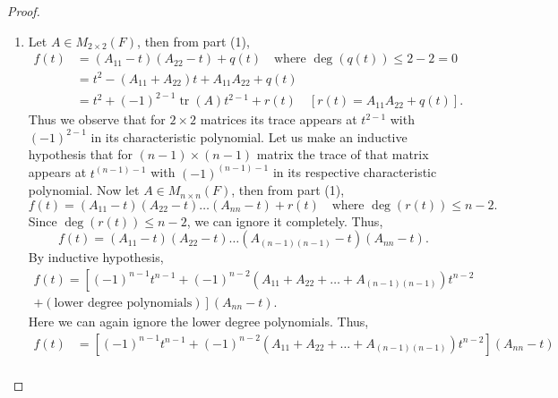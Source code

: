 \documentclass[12pt, a4paper]{article}
\theoremstyle{definition}
\theoremstyle{remark}
\DeclareMathOperator{\tr}{tr}
\begin{document}
\begin{proof}
\begin{enumerate}
    Now for $j \ge 2$, $B_{1j} = A_{1j}$ which are independent of $t$, and the submatrices $\widetilde{B}_{1j}$ loses 2 of its diagonal entries, so there are at most $n - 2$ diagonal entries. Thus $\sum_{j=2}^{n} (-1)^{1+j} B_{1j} \det(\widetilde{B}_{1j})$ is a polynomial, say $p(t)$, of degree at most $n - 2$. Hence,
    \begin{align*}
    f(t) &= (A_{11} - t)(A_{22} - t) \dots (A_{nn} - t) + r(t) + p(t) \\
    &= (A_{11} - t)(A_{22} - t) \dots (A_{nn} - t) + q(t)
    \end{align*}
    where $q(t)$ is a polynomial of degree at most $n - 2$. Thus the theorem holds true for $n \times n$ matrices for $n \in \mathbb{Z}^+$.

    \item Let $A \in M_{2 \times 2}(F)$, then from part (1),
    \begin{align*}
    f(t) &= (A_{11} - t)(A_{22} - t) + q(t) \quad \text{where } \deg(q(t)) \le 2 - 2 = 0 \\
    &= t^2 - (A_{11} + A_{22}) t + A_{11} A_{22} + q(t) \\
    &= t^2 + (-1)^{2-1} \tr(A) t^{2-1} + r(t) \quad \left[ r(t) = A_{11} A_{22} + q(t) \right].
    \end{align*}
    Thus we observe that for $2 \times 2$ matrices its trace appears at $t^{2-1}$ with $(-1)^{2-1}$ in its characteristic polynomial. Let us make an inductive hypothesis that for $(n-1) \times (n-1)$ matrix the trace of that matrix appears at $t^{(n-1)-1}$ with $(-1)^{(n-1)-1}$ in its respective characteristic polynomial. Now let $A \in M_{n \times n}(F)$, then from part (1),
    \[
    f(t) = (A_{11} - t)(A_{22} - t) \dots (A_{nn} - t) + r(t) \quad \text{where } \deg(r(t)) \le n - 2.
    \]
    Since $\deg(r(t)) \le n - 2$, we can ignore it completely. Thus,
    \[
    f(t) = (A_{11} - t)(A_{22} - t) \dots (A_{(n-1)(n-1)} - t)(A_{nn} - t).
    \]
    By inductive hypothesis,
    \begin{align*}
    f(t) = \left[ (-1)^{n-1} t^{n-1} + (-1)^{n-2} (A_{11} + A_{22} + \dots + A_{(n-1)(n-1)}) t^{n-2}\right. \\
    \left. + (\text{lower degree polynomials}) \right] (A_{nn} - t).
    \end{align*}
    Here we can again ignore the lower degree polynomials. Thus,
    \begin{align*}
    f(t) &= \left[ (-1)^{n-1} t^{n-1} + (-1)^{n-2} (A_{11} + A_{22} + \dots + A_{(n-1)(n-1)}) t^{n-2} \right] (A_{nn} - t) \\

\end{align*}
\end{enumerate}
\end{proof}
\end{document}
